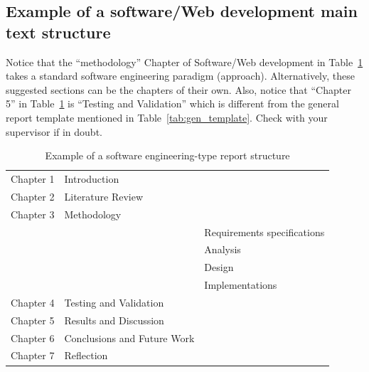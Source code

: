 \subsection{Example of a software/Web development main text structure}
\label{subsec:se_chpters}
Notice that the ``methodology'' Chapter of Software/Web development in Table~\ref{tab:soft_eng_temp} takes a standard software engineering paradigm (approach). Alternatively, these suggested sections can be the chapters of their own. Also, notice that ``Chapter 5'' in Table~\ref{tab:soft_eng_temp} is ``Testing and Validation'' which is different from the general report template mentioned in Table~\ref{tab:gen_template}. Check with your supervisor if in doubt.
\begin{table}[!ht]
    \centering
    \caption{Example of a software engineering-type report structure}
    \label{tab:soft_eng_temp}
    \begin{tabular}{lll}     
        \toprule                   
        Chapter 1 & Introduction   &    \\        
        Chapter 2 & Literature Review  &    \\                   
        Chapter 3 & Methodology   &    \\
        &               & Requirements specifications   \\
        &               & Analysis   \\
        &               & Design   \\
        &               & Implementations   \\
        Chapter 4 & Testing and Validation  &    \\
        Chapter 5 & Results and Discussion      &    \\
        Chapter 6 & Conclusions and Future Work  &    \\        
        Chapter 7 & Reflection  &    \\                          
        \bottomrule
    \end{tabular}
\end{table}

